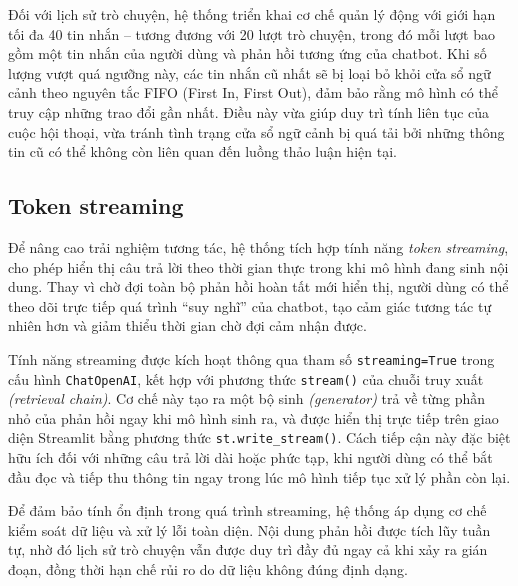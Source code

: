 Đối với lịch sử trò chuyện, hệ thống triển khai cơ chế quản lý động với giới hạn tối đa 40 tin nhắn -- tương đương với 20 lượt trò chuyện, trong đó mỗi lượt bao gồm một tin nhắn của người dùng và phản hồi tương ứng của chatbot. Khi số lượng vượt quá ngưỡng này, các tin nhắn cũ nhất sẽ bị loại bỏ khỏi cửa sổ ngữ cảnh theo nguyên tắc FIFO (First In, First Out), đảm bảo rằng mô hình có thể truy cập những trao đổi gần nhất. Điều này vừa giúp duy trì tính liên tục của cuộc hội thoại, vừa tránh tình trạng cửa sổ ngữ cảnh bị quá tải bởi những thông tin cũ có thể không còn liên quan đến luồng thảo luận hiện tại.

\subsection{Token streaming}

Để nâng cao trải nghiệm tương tác, hệ thống tích hợp tính năng \emph{token streaming}, cho phép hiển thị câu trả lời theo thời gian thực trong khi mô hình đang sinh nội dung. Thay vì chờ đợi toàn bộ phản hồi hoàn tất mới hiển thị, người dùng có thể theo dõi trực tiếp quá trình ``suy nghĩ'' của chatbot, tạo cảm giác tương tác tự nhiên hơn và giảm thiểu thời gian chờ đợi cảm nhận được.

Tính năng streaming được kích hoạt thông qua tham số \texttt{streaming=True} trong cấu hình \texttt{ChatOpenAI}, kết hợp với phương thức \texttt{stream()} của chuỗi truy xuất \emph{(retrieval chain)}. Cơ chế này tạo ra một bộ sinh \emph{(generator)} trả về từng phần nhỏ của phản hồi ngay khi mô hình sinh ra, và được hiển thị trực tiếp trên giao diện Streamlit bằng phương thức \texttt{st.write\_stream()}. Cách tiếp cận này đặc biệt hữu ích đối với những câu trả lời dài hoặc phức tạp, khi người dùng có thể bắt đầu đọc và tiếp thu thông tin ngay trong lúc mô hình tiếp tục xử lý phần còn lại.

Để đảm bảo tính ổn định trong quá trình streaming, hệ thống áp dụng cơ chế kiểm soát dữ liệu và xử lý lỗi toàn diện. Nội dung phản hồi được tích lũy tuần tự, nhờ đó lịch sử trò chuyện vẫn được duy trì đầy đủ ngay cả khi xảy ra gián đoạn, đồng thời hạn chế rủi ro do dữ liệu không đúng định dạng.